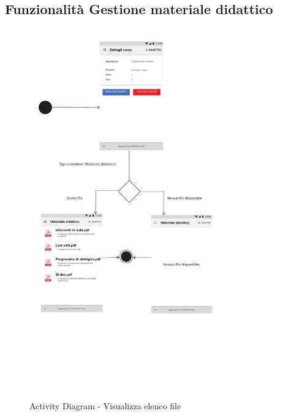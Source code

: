\subsection{Funzionalità Gestione materiale didattico}
\clearpage
\newpage
\begin{figure}
	\centering
	\includegraphics[width=6in]{imgs/gruppo1/activity_diagrams/AD13_viasualizza_elenco_file.pdf}
	\caption{Activity Diagram - Visualizza elenco file}
	\label{diag:visualizzaElencoFileAD}
\end{figure}
\newpage

